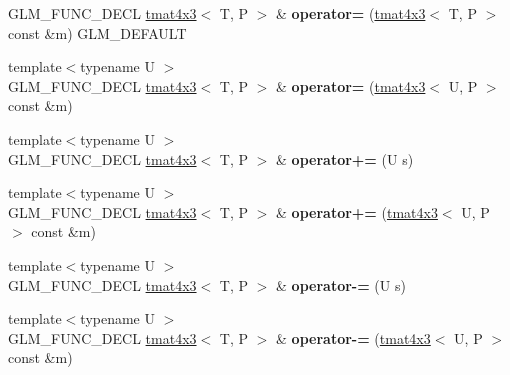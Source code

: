 \begin{DoxyCompactItemize}
\item 
\hypertarget{structglm_1_1tmat4x3_af582848d81ec2c17426b9776e7f301c0}{G\-L\-M\-\_\-\-F\-U\-N\-C\-\_\-\-D\-E\-C\-L \hyperlink{structglm_1_1tmat4x3}{tmat4x3}$<$ T, P $>$ \& {\bfseries operator=} (\hyperlink{structglm_1_1tmat4x3}{tmat4x3}$<$ T, P $>$ const \&m) G\-L\-M\-\_\-\-D\-E\-F\-A\-U\-L\-T}\label{structglm_1_1tmat4x3_af582848d81ec2c17426b9776e7f301c0}

\item 
\hypertarget{structglm_1_1tmat4x3_a1a8400e31fd17c23aff288242b7a78ca}{{\footnotesize template$<$typename U $>$ }\\G\-L\-M\-\_\-\-F\-U\-N\-C\-\_\-\-D\-E\-C\-L \hyperlink{structglm_1_1tmat4x3}{tmat4x3}$<$ T, P $>$ \& {\bfseries operator=} (\hyperlink{structglm_1_1tmat4x3}{tmat4x3}$<$ U, P $>$ const \&m)}\label{structglm_1_1tmat4x3_a1a8400e31fd17c23aff288242b7a78ca}

\item 
\hypertarget{structglm_1_1tmat4x3_a24679f2dacf9cc1f8f708f40bb1f3aab}{{\footnotesize template$<$typename U $>$ }\\G\-L\-M\-\_\-\-F\-U\-N\-C\-\_\-\-D\-E\-C\-L \hyperlink{structglm_1_1tmat4x3}{tmat4x3}$<$ T, P $>$ \& {\bfseries operator+=} (U s)}\label{structglm_1_1tmat4x3_a24679f2dacf9cc1f8f708f40bb1f3aab}

\item 
\hypertarget{structglm_1_1tmat4x3_a74f871665b46c2f00ef0bd0267816e4b}{{\footnotesize template$<$typename U $>$ }\\G\-L\-M\-\_\-\-F\-U\-N\-C\-\_\-\-D\-E\-C\-L \hyperlink{structglm_1_1tmat4x3}{tmat4x3}$<$ T, P $>$ \& {\bfseries operator+=} (\hyperlink{structglm_1_1tmat4x3}{tmat4x3}$<$ U, P $>$ const \&m)}\label{structglm_1_1tmat4x3_a74f871665b46c2f00ef0bd0267816e4b}

\item 
\hypertarget{structglm_1_1tmat4x3_a124dd7f16916a27ab14d698c0760f6f2}{{\footnotesize template$<$typename U $>$ }\\G\-L\-M\-\_\-\-F\-U\-N\-C\-\_\-\-D\-E\-C\-L \hyperlink{structglm_1_1tmat4x3}{tmat4x3}$<$ T, P $>$ \& {\bfseries operator-\/=} (U s)}\label{structglm_1_1tmat4x3_a124dd7f16916a27ab14d698c0760f6f2}

\item 
\hypertarget{structglm_1_1tmat4x3_a7c8ddab1781bfac021f6ccb388f4320c}{{\footnotesize template$<$typename U $>$ }\\G\-L\-M\-\_\-\-F\-U\-N\-C\-\_\-\-D\-E\-C\-L \hyperlink{structglm_1_1tmat4x3}{tmat4x3}$<$ T, P $>$ \& {\bfseries operator-\/=} (\hyperlink{structglm_1_1tmat4x3}{tmat4x3}$<$ U, P $>$ const \&m)}\label{structglm_1_1tmat4x3_a7c8ddab1781bfac021f6ccb388f4320c}


\end{DoxyCompactItemize}

